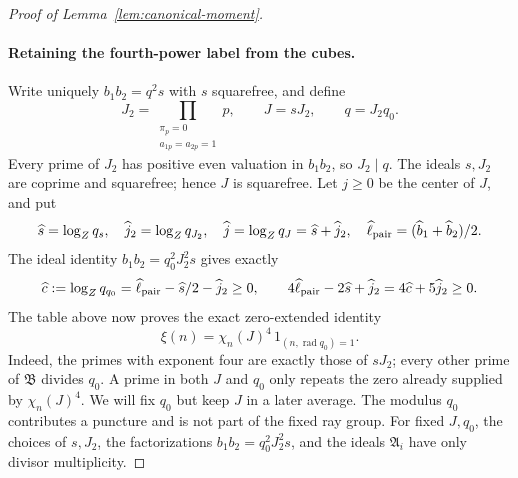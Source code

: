 \documentclass[11pt,a4paper]{article}
\numberwithin{equation}{section}
\numberwithin{figure}{section}
\theoremstyle{definition}
\theoremstyle{remark}
\begin{document}
\begin{proof}[Proof of Lemma~\ref{lem:canonical-moment}]
\paragraph{Retaining the fourth-power label from the cubes.}
Write uniquely \(b_1b_2=q^2s\) with \(s\) squarefree, and define
\[
 J_2=\prod_{\substack{\pi_p=0\\a_{1p}=a_{2p}=1}}p,\qquad
 J=sJ_2,\qquad q=J_2q_0.
\]
Every prime of \(J_2\) has positive even valuation in \(b_1b_2\),
so \(J_2\mid q\).  The ideals \(s,J_2\) are coprime and squarefree;
hence \(J\) is squarefree.  Let \(j\ge0\) be the center of \(J\), and put
\[
 \widehat s=\log_Zq_s,\quad \widehat j_2=\log_Zq_{J_2},\quad
 \widehat j=\log_Zq_J=\widehat s+\widehat j_2,\quad
 \widehat\ell_{\rm pair}=(\widehat b_1+\widehat b_2)/2.
\]
The ideal identity \(b_1b_2=q_0^2J_2^2s\) gives exactly
\begin{equation}\label{eq:inverse-cube-actual}
 \widehat c:=\log_Zq_{q_0}
   =\widehat\ell_{\rm pair}-\widehat s/2-\widehat j_2\ge0,
 \qquad
 4\widehat\ell_{\rm pair}-2\widehat s+\widehat j_2
   =4\widehat c+5\widehat j_2\ge0.
\end{equation}
The table above now proves the exact zero-extended identity
\begin{equation}\label{eq:retained-cube-label}
 \xi(n)=\chi_n(J)^4\,1_{(n,\operatorname{rad}q_0)=1}.
\end{equation}
Indeed, the primes with exponent four are exactly those of \(sJ_2\);
every other prime of \(\mathfrak B\) divides \(q_0\).  A prime in
both \(J\) and \(q_0\) only repeats the zero already supplied by
\(\chi_n(J)^4\).  We will fix \(q_0\) but keep \(J\) in a later
average.  The modulus \(q_0\) contributes a puncture and is not part
of the fixed ray group.
For fixed \(J,q_0\), the choices of \(s,J_2\), the factorizations
\(b_1b_2=q_0^2J_2^2s\), and the ideals \(\mathfrak A_i\) have only
divisor multiplicity.


\end{proof}
\end{document}

